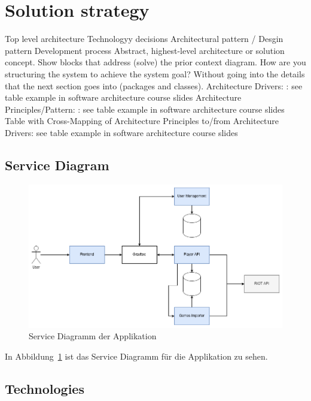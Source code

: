 \section{Solution strategy}
Top level architecture
Technologyy decisions
Architectural pattern / Desgin pattern
Development process
Abstract, highest-level architecture or solution concept. Show blocks that address (solve) the prior context diagram. How are you structuring the system to achieve the system goal? Without going into the details that the next section goes into (packages and classes).
Architecture Drivers: : see table example in software architecture course slides
Architecture Principles/Pattern: : see table example in software architecture course slides
Table with Cross-Mapping of Architecture Principles to/from Architecture Drivers: see table example in software architecture course slides

\subsection{Service Diagram}

\begin{figure}
    \centering
    \includegraphics[width=\textwidth]{images/cdc-05-service-diagram.drawio}
    \caption{Service Diagramm der Applikation}
    \label{fig:service-diagram}
\end{figure}

In Abbildung~\ref{fig:service-diagram} ist das Service Diagramm für die Applikation zu sehen.

\subsection{Technologies}

